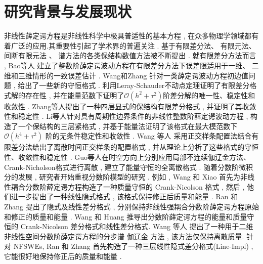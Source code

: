 \section{研究背景与发展现状}
非线性薛定谔方程是非线性科学中极具普适性的基本方程 , 在众多物理学领域都有着广泛的应用.其重要性引起了学术界的普遍关注 . 基于有限差分法\cite{liFastEnergyConserving2018}、 有限元法\cite{karakashianSpacetimeFiniteElement1998}、 间断有限元法\cite{zhangConservativeLocalDiscontinuous2017} 、 谱方法\cite{gongConservativeFourierPseudospectral2017}的各类保结构数值方法被不断提出 . 
就有限差分方法而言 , Bao等人\cite{baoUniformErrorEstimates2012} 建立了整数阶薛定谔波动方程在有限差分方法下误差限适用于一维、 二维和三维情形的一致误差估计 . 
Wang和Zhang\cite{wangAnalysisNewConservative2006} 针对一类薛定谔波动方程初边值问题 , 给出了一些新的守恒格式 . 利用Leray-Schauder不动点定理证明了有限差分格式解的存在性 , 
并在能量范数下证明了$\mathcal{O}(h^2+\tau^2)$阶差分解的唯一性、稳定性和收敛性 . Zhang等人\cite{zhangConservativeNumericalScheme2003}提出了一种四层显式的保结构有限差分格式 , 并证明了其收敛性和稳定性 . 
Li等人\cite{liCompactFiniteDifference2012}针对具有周期性边界条件的非线性整数阶薛定谔波动方程 , 构造了一个保结构的三层紧格式 , 并基于能量法证明了该格式在最大模范数下$\mathcal{O}(h^4+\tau^2)$ 阶的无条件稳定性和收敛性 . 
Wang 等人\cite{wangDiscretetimeOrthogonalSpline2011} 采用正交样条配置法结合有限差分法给出了离散时间正交样条的配置格式 , 并从理论上分析了这些格式的守恒性、收敛性和稳定性 . 
Guo等人\cite{guoEnergyConservingLocal2015}在时空方向上分别应用局部不连续伽辽金方法、Crank-Nicholson格式进行离散 , 建立了能量守恒的全离散格式 . 
随着分数阶微积分的发展 , 研究者开始重视分数阶模型的研究 .
例如 , Wang 和 Xiao \cite{wangCrankNicolsonDifference2013} 首先为非线性耦合分数阶薛定谔方程构造了一种质量守恒的 Crank-Nicolson 格式 , 
然后 , 他们进一步提出了一种线性隐式格式 , 该格式保持修正后质量和能量\cite{wangLinearlyImplicitConservative2014} . 
Ran 和 Zhang \cite{ranConservativeDifferenceScheme2016} 提出了隐式及线性差分格式 , 分别保持非线性强耦合分数阶薛定谔方程原始和修正的质量和能量 . 
Wang 和 Huang \cite{wangEnergyConservativeDifference2015,wangConservativeLinearizedDifference2015} 推导出分数阶薛定谔方程的能量和质量守恒的 Crank-Nicolson 差分格式和线性差分格式.
Wang 等人 \cite{wangSplitstepSpectralGalerkin2019} 提出了一种用于二维非线性空间分数阶薛定谔方程的分步谱 伽辽金 方法 , 该方法仅保持离散质量.
针对 NFSWEs, Ran 和 Zhang \cite{ranLinearlyImplicitConservative2016} 首先构造了一种三层线性隐式差分格式(Line-Impl) , 它能很好地保持修正后的质量和能量 . 
